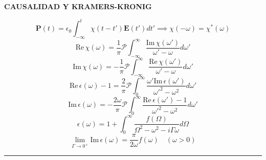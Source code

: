 \documentclass[twocolumn]{article}
\begin{document}
	\begin{center}\textbf{\footnotesize CAUSALIDAD Y KRAMERS-KRONIG}\end{center}
	\vspace{-2mm}
	\begin{equation*}
		\mathbf{P}(t) = \epsilon_0 \int_{-\infty}^{t} \chi(t - t')\mathbf{E}(t') dt' \implies \chi(-\omega) = \chi^*(\omega)
	\end{equation*}
	\begin{equation*}
		\text{Re}\,\chi(\omega) = \frac{1}{\pi}\mathcal{P}\int_{-\infty}^{\infty} \frac{\text{Im}\,\chi(\omega')}{\omega' - \omega} d\omega'
	\end{equation*}
	\begin{equation*}
		\text{Im}\,\chi(\omega) = -\frac{1}{\pi}\mathcal{P}\int_{-\infty}^{\infty} \frac{\text{Re}\,\chi(\omega')}{\omega' - \omega} d\omega'
	\end{equation*}
	\begin{equation*}
		\text{Re}\,\epsilon(\omega) - 1 = \frac{2}{\pi}\mathcal{P}\int_{0}^{\infty} \frac{\omega' \text{Im}\,\epsilon(\omega')}{\omega'^2 - \omega^2} d\omega'
	\end{equation*}
	\begin{equation*}
		\text{Im}\,\epsilon(\omega) = -\frac{2\omega}{\pi}\mathcal{P}\int_{0}^{\infty} \frac{\text{Re}\,\epsilon(\omega') - 1}{\omega'^2 - \omega^2} d\omega'
	\end{equation*}
	\begin{equation*}
		\epsilon(\omega) = 1 + \int_{0}^{\infty} \frac{f(\Omega)}{\Omega^2 - \omega^2 - i\Gamma\omega} d\Omega
	\end{equation*}
	\begin{equation*}
		\lim_{\Gamma \to 0^+} \text{Im}\,\epsilon(\omega) = \frac{\pi}{2\omega} f(\omega) \quad (\omega > 0)
	\end{equation*}
	
	\vspace{-2mm}\hrule\vspace{1mm}
	
\end{document}
